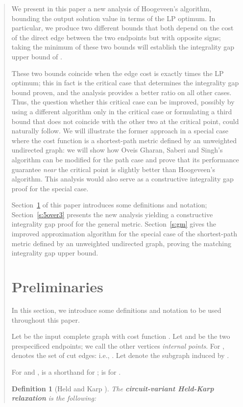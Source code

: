\documentclass[11pt,letterpaper]{article}
\newtheorem{defn}{Definition}
\begin{document}
\begin{quote}
We present in this paper a new analysis of Hoogeveen's algorithm, bounding the output solution value in terms of the LP optimum. In particular, we produce two different bounds that both depend on the cost of the direct edge between the two endpoints but with opposite signs; taking the minimum of these two bounds will establish the integrality gap upper bound of .

These two bounds coincide when the edge cost is exactly  times the LP optimum; this in fact is the critical case that determines the integrality gap bound proven, and the analysis provides a better ratio on all other cases. Thus, the question whether this critical case can be improved, possibly by using a different algorithm only in the critical case or formulating a third bound that does not coincide with the other two at the critical point, could naturally follow. We will illustrate the former approach in a special case where the cost function is a shortest-path metric defined by an unweighted undirected graph: we will show how Oveis Gharan, Saberi and Singh's algorithm can be modified for the path case and prove that its performance guarantee \emph{near} the critical point is slightly better than Hoogeveen's algorithm. This analysis would also serve as a constructive integrality gap proof for the special case.

Section~\ref{s:pre} of this paper introduces some definitions and notation; Section~\ref{s:5over3} presents the new analysis yielding a constructive integrality gap proof for the general metric. Section~\ref{s:gm} gives the improved approximation algorithm for the special case of the shortest-path metric defined by an unweighted undirected graph, proving the matching integrality gap upper bound.

\section{Preliminaries}\label{s:pre}

In this section, we introduce some definitions and notation to be used throughout this paper.

Let  be the input complete graph with cost function . Let  and  be the two prespecificed endpoints; we call the other vertices \emph{internal points}. For ,  denotes the set of cut edges: i.e., . Let  denote the subgraph induced by .

For  and ,  is a shorthand for ;  is for .

\begin{defn}[Held and Karp \cite{HK}]
\label{d:hkcircuit}
The \textbf{circuit-variant Held-Karp relaxation} is the following:
\end{defn}


\end{quote}
\end{document}
